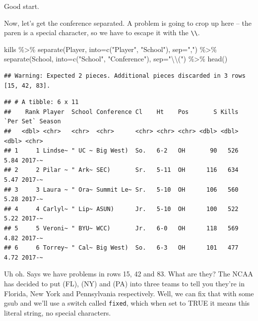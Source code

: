 \documentclass[
]{book}
\newenvironment{Shaded}{\begin{snugshade}}{\end{snugshade}}
\newcommand{\AttributeTok}[1]{\textcolor[rgb]{0.77,0.63,0.00}{#1}}
\newcommand{\FunctionTok}[1]{\textcolor[rgb]{0.00,0.00,0.00}{#1}}
\newcommand{\NormalTok}[1]{#1}
\newcommand{\SpecialCharTok}[1]{\textcolor[rgb]{0.00,0.00,0.00}{#1}}
\newcommand{\StringTok}[1]{\textcolor[rgb]{0.31,0.60,0.02}{#1}}
\begin{document}
Good start.

Now, let's get the conference separated. A problem is going to crop up here -- the paren is a special character, so we have to escape it with the \texttt{\textbackslash{}\textbackslash{}}.

\begin{Shaded}
\begin{Highlighting}[]
\NormalTok{kills }\SpecialCharTok{\%\textgreater{}\%} 
  \FunctionTok{separate}\NormalTok{(Player, }\AttributeTok{into=}\FunctionTok{c}\NormalTok{(}\StringTok{"Player"}\NormalTok{, }\StringTok{"School"}\NormalTok{), }\AttributeTok{sep=}\StringTok{","}\NormalTok{) }\SpecialCharTok{\%\textgreater{}\%}
  \FunctionTok{separate}\NormalTok{(School, }\AttributeTok{into=}\FunctionTok{c}\NormalTok{(}\StringTok{"School"}\NormalTok{, }\StringTok{"Conference"}\NormalTok{), }\AttributeTok{sep=}\StringTok{"}\SpecialCharTok{\textbackslash{}\textbackslash{}}\StringTok{("}\NormalTok{) }\SpecialCharTok{\%\textgreater{}\%} 
  \FunctionTok{head}\NormalTok{()}
\end{Highlighting}
\end{Shaded}

\begin{verbatim}
## Warning: Expected 2 pieces. Additional pieces discarded in 3 rows [15, 42, 83].
\end{verbatim}

\begin{verbatim}
## # A tibble: 6 x 11
##    Rank Player  School Conference Cl    Ht    Pos       S Kills `Per Set` Season
##   <dbl> <chr>   <chr>  <chr>      <chr> <chr> <chr> <dbl> <dbl>     <dbl> <chr> 
## 1     1 Lindse~ " UC ~ Big West)  So.   6-2   OH       90   526      5.84 2017-~
## 2     2 Pilar ~ " Ark~ SEC)       Sr.   5-11  OH      116   634      5.47 2017-~
## 3     3 Laura ~ " Ora~ Summit Le~ Sr.   5-10  OH      106   560      5.28 2017-~
## 4     4 Carlyl~ " Lip~ ASUN)      Jr.   5-10  OH      100   522      5.22 2017-~
## 5     5 Veroni~ " BYU~ WCC)       Jr.   6-0   OH      118   569      4.82 2017-~
## 6     6 Torrey~ " Cal~ Big West)  So.   6-3   OH      101   477      4.72 2017-~
\end{verbatim}

Uh oh. Says we have problems in rows 15, 42 and 83. What are they? The NCAA has decided to put (FL), (NY) and (PA) into three teams to tell you they're in Florida, New York and Pennsylvania respectively. Well, we can fix that with some gsub and we'll use a switch called \texttt{fixed}, which when set to TRUE it means this literal string, no special characters.
\end{document}
